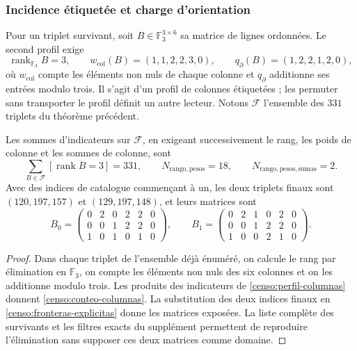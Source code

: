 \subsubsection{Incidence étiquetée et charge d'orientation}

Pour un triplet survivant, soit \(B\in\mathbb F_3^{3\times6}\) sa
matrice de lignes ordonnées. Le second profil exige
\begin{equation}
 \operatorname{rank}_{\mathbb F_3}B=3,\qquad
 w_{\mathrm{col}}(B)=(1,1,2,2,3,0),\qquad
 q_{\partial}(B)=(1,2,2,1,2,0),
 \label{censo:perfil-columnas}
\end{equation}
où \(w_{\mathrm{col}}\) compte les éléments non nuls de chaque
colonne et \(q_{\partial}\) additionne ses entrées modulo trois. Il s'agit d'un profil
de colonnes étiquetées ; les permuter sans transporter le profil définit un autre
lecteur. Notons \(\mathcal F\) l'ensemble des \(331\) triplets
du théorème précédent.

\begin{proposition}
\label{censo:dos-matrices}
Les sommes d'indicateurs sur \(\mathcal F\), en exigeant successivement
le rang, les poids de colonne et les sommes de colonne, sont
\begin{equation}
 \sum_{B\in\mathcal F}[\operatorname{rank}B=3]=331,
 \qquad N_{\mathrm{rango,pesos}}=18,
 \qquad N_{\mathrm{rango,pesos,sumas}}=2.
 \label{censo:conteo-columnas}
\end{equation}
Avec des indices de catalogue commençant à un, les deux triplets finaux sont
\((120,197,157)\) et \((129,197,148)\), et leurs matrices sont
\[
 B_0=\begin{pmatrix}0&2&0&2&2&0\\0&0&1&2&2&0\\1&0&1&0&1&0\end{pmatrix},
 \qquad
 B_1=\begin{pmatrix}0&2&1&0&2&0\\0&0&1&2&2&0\\1&0&0&2&1&0\end{pmatrix}.
\]
\end{proposition}
\begin{proof}
Dans chaque triplet de l'ensemble déjà énuméré, on calcule le rang par élimination en \(\mathbb F_3\), on compte les éléments non nuls des six colonnes et on les additionne modulo trois. Les produits des indicateurs de \eqref{censo:perfil-columnas} donnent \eqref{censo:conteo-columnas}.
La substitution des deux indices finaux en
\eqref{censo:fronteras-explicitas} donne les matrices exposées. La liste
complète des survivants et les filtres exacts du supplément permettent
de reproduire l'élimination sans supposer ces deux matrices comme domaine.
\end{proof}

